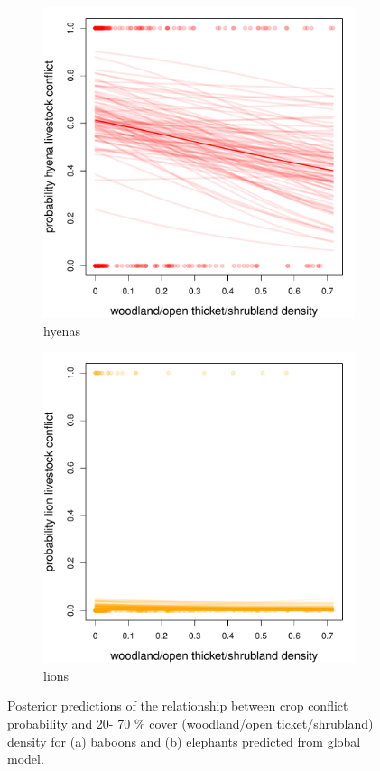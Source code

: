 \documentclass[12pt,]{article}
\begin{document}
\begin{figure}[H]
  \centering
	\begin{subfigure}[b]{0.49\textwidth}
	\includegraphics[width=\textwidth]{Figures/c2070_livestock_global_conflict_hyena.pdf} 
    \caption{hyenas}
   	    \label{fig:cropC2070hyena}
\end{subfigure}
\begin{subfigure}[b]{0.49\textwidth}
	\includegraphics[width=\textwidth]{Figures/c2070_livestock_global_conflict_lion.pdf}  
    \caption{lions}
  	\label{fig:cropC2070leo}
\end{subfigure}
\caption{Posterior predictions of the relationship between crop conflict probability and 20- 70 \% cover (woodland/open ticket/shrubland) density for (a) baboons and (b) elephants predicted from global model.}
\end{figure}
\end{document}
